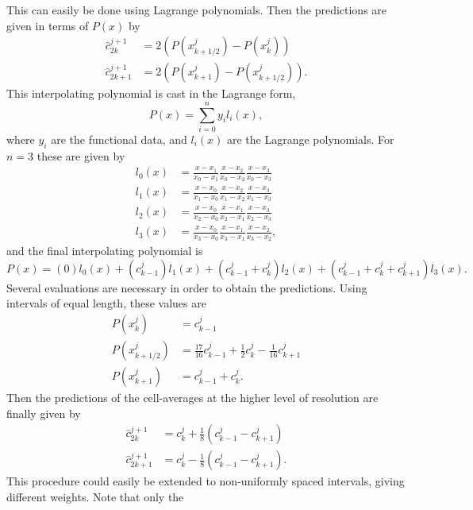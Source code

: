 \documentclass{article}
\begin{document}
This can easily be done using Lagrange polynomials. Then the predictions are given in terms of $P(x)$ by
\begin{align}
	\hat{c}^{j+1}_{2k} &= 2 \left( P(x^{j}_{k+1/2}) - P(x^{j}_{k}) \right) \\
	\hat{c}^{j+1}_{2k+1} &= 2 \left( P(x^{j}_{k+1}) - P(x^{j}_{k+1/2}) \right).
\end{align}
This interpolating polynomial is cast in the Lagrange form,
\begin{equation}
P(x) = \sum_{i=0}^{n} y_{i} l_{i}(x),
\end{equation}
where $y_{i}$ are the functional data, and $l_{i}(x)$ are the Lagrange polynomials. For $n=3$ these
are given by
\begin{align}
    l_{0}(x) &= \frac{x-x_1}{x_0-x_1} \frac{x-x_2}{x_0-x_2} \frac{x-x_3}{x_0-x_3} \\
    l_{1}(x) &= \frac{x-x_0}{x_1-x_0} \frac{x-x_2}{x_1-x_2} \frac{x-x_3}{x_1-x_3} \\
    l_{2}(x) &= \frac{x-x_0}{x_2-x_0} \frac{x-x_1}{x_2-x_1} \frac{x-x_3}{x_2-x_3} \\
    l_{3}(x) &= \frac{x-x_0}{x_3-x_0} \frac{x-x_1}{x_3-x_1} \frac{x-x_2}{x_3-x_2},
\end{align}
and the final interpolating polynomial is
\begin{equation}
	P(x) = (0) l_{0}(x) + ( c^{j}_{k-1} ) l_{1}(x) + ( c^{j}_{k-1} + c^{j}_{k} ) l_{2}(x)
		+ ( c^{j}_{k-1} + c^{j}_{k} + c^{j}_{k+1} ) l_{3}(x).
\end{equation}
Several evaluations are necessary in order to obtain the predictions. Using intervals of equal length, these values are
\begin{align}
	P(x^{j}_{k}) &= c^{j}_{k-1} \\
	P(x^{j}_{k+1/2}) &= \frac{17}{16} c^{j}_{k-1} + \frac{1}{2} c^{j}_{k} - \frac{1}{16} c^{j}_{k+1} \\
	P(x^{j}_{k+1}) &= c^{j}_{k-1} + c^{j}_{k}.
\end{align}
Then the predictions of the cell-averages at the higher level of resolution are finally given by
\begin{align}
	\hat{c}^{j+1}_{2k} & = c^{j}_{k} + \frac{1}{8} \left( c^{j}_{k-1} - c^{j}_{k+1} \right) \\
	\hat{c}^{j+1}_{2k+1} & = c^{j}_{k} - \frac{1}{8} \left( c^{j}_{k-1} - c^{j}_{k+1} \right).
\end{align}
This procedure could easily be extended to non-uniformly
spaced intervals, giving different weights. Note that only the
\end{document}
